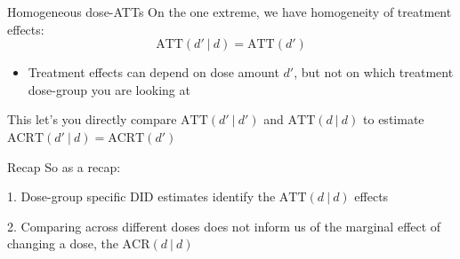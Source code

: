 \documentclass[aspectratio=169,t]{beamer}
\begin{document}

\begin{frame}{Homogeneous dose-ATTs}
  On the one extreme, we have homogeneity of treatment effects:
  $$
    \text{ATT}(d'  \ | \ d) = \text{ATT}(d')
  $$

  \begin{itemize}
    \item Treatment effects can depend on dose amount $d'$, but not on which treatment dose-group you are looking at
  \end{itemize}

  \pause
  \bigskip\bigskip
  This let's you directly compare $\text{ATT}(d'  \ | \ d')$ and $\text{ATT}(d \ | \ d)$ to estimate $\text{ACRT}(d' \ | \ d) = \text{ACRT}(d')$
\end{frame}


%
%
%


\begin{frame}{Recap}
  So as a recap:

  \bigskip
  {\color{blue} 1.} Dose-group specific DID estimates identify the $\text{ATT}(d \ | \ d)$ effects

  \bigskip
  {\color{blue} 2.} Comparing across different doses does not inform us of the marginal effect of changing a dose, the $\text{ACR}(d \ | \ d)$
\end{frame}
\end{document}
